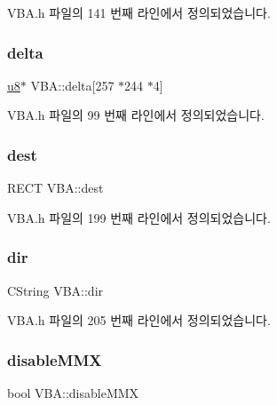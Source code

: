 V\+B\+A.\+h 파일의 141 번째 라인에서 정의되었습니다.

\mbox{\label{class_v_b_a_ae53d4a6574bd47657fa6bd76eabd8543}} 
\subsubsection{\texorpdfstring{delta}{delta}}
{\footnotesize\ttfamily \mbox{\hyperlink{_system_8h_aed742c436da53c1080638ce6ef7d13de}{u8}}$\ast$ V\+B\+A\+::delta\mbox{[}257 $\ast$244 $\ast$4\mbox{]}}



V\+B\+A.\+h 파일의 99 번째 라인에서 정의되었습니다.

\mbox{\label{class_v_b_a_aed77fc82f818810cc87c470768c75e05}} 
\subsubsection{\texorpdfstring{dest}{dest}}
{\footnotesize\ttfamily R\+E\+CT V\+B\+A\+::dest}



V\+B\+A.\+h 파일의 199 번째 라인에서 정의되었습니다.

\mbox{\label{class_v_b_a_a7177c0b51e84b91c6027ea73461c457e}} 
\subsubsection{\texorpdfstring{dir}{dir}}
{\footnotesize\ttfamily C\+String V\+B\+A\+::dir}



V\+B\+A.\+h 파일의 205 번째 라인에서 정의되었습니다.

\mbox{\label{class_v_b_a_ac417f46c467d0fcf095731620ca7de71}} 
\subsubsection{\texorpdfstring{disable\+M\+MX}{disableMMX}}
{\footnotesize\ttfamily bool V\+B\+A\+::disable\+M\+MX}



